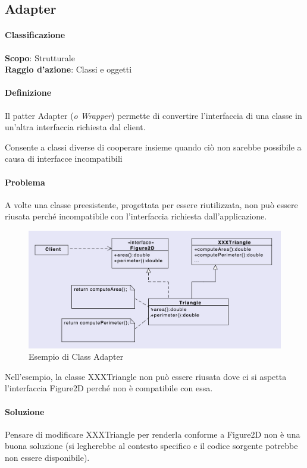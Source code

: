 \subsection{Adapter}

\paragraph{Classificazione}
\textbf{Scopo}: Strutturale \\
\textbf{Raggio d'azione}: Classi e oggetti

\paragraph{Definizione}
Il patter Adapter (\textit{o Wrapper}) permette di convertire l'interfaccia di una classe in un'altra interfaccia richiesta dal client.

Consente a classi diverse di cooperare insieme quando ciò non sarebbe possibile a causa di interfacce incompatibili

\paragraph{Problema} A volte una classe preesistente, progettata per essere riutilizzata, non può essere riusata perché incompatibile con l'interfaccia richiesta dall'applicazione.

\begin{figure}[H]
    \centering
    \includegraphics[width=0.75\linewidth]{assets/pattern/adapter/class-adapter.png}
    \caption{Esempio di Class Adapter}
\end{figure}

Nell’esempio, la classe XXXTriangle non può essere riusata dove ci si aspetta l’interfaccia Figure2D perché non è compatibile con essa.

\paragraph{Soluzione} Pensare di modificare XXXTriangle per renderla conforme a Figure2D non è una buona soluzione (si legherebbe al contesto specifico e il codice sorgente potrebbe non essere disponibile).

